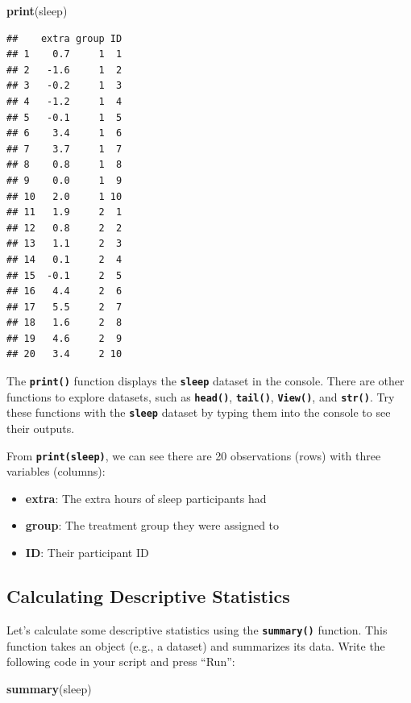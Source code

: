 \documentclass[
]{book}
\newenvironment{Shaded}{\begin{snugshade}}{\end{snugshade}}
\newcommand{\FunctionTok}[1]{\textcolor[rgb]{0.13,0.29,0.53}{\textbf{#1}}}
\newcommand{\NormalTok}[1]{#1}
\begin{document}
\begin{Shaded}
\begin{Highlighting}[]
\FunctionTok{print}\NormalTok{(sleep) }
\end{Highlighting}
\end{Shaded}

\begin{verbatim}
##    extra group ID
## 1    0.7     1  1
## 2   -1.6     1  2
## 3   -0.2     1  3
## 4   -1.2     1  4
## 5   -0.1     1  5
## 6    3.4     1  6
## 7    3.7     1  7
## 8    0.8     1  8
## 9    0.0     1  9
## 10   2.0     1 10
## 11   1.9     2  1
## 12   0.8     2  2
## 13   1.1     2  3
## 14   0.1     2  4
## 15  -0.1     2  5
## 16   4.4     2  6
## 17   5.5     2  7
## 18   1.6     2  8
## 19   4.6     2  9
## 20   3.4     2 10
\end{verbatim}

The \textbf{\texttt{print()}} function displays the \textbf{\texttt{sleep}} dataset in the console. There are other functions to explore datasets, such as \textbf{\texttt{head()}}, \textbf{\texttt{tail()}}, \textbf{\texttt{View()}}, and \textbf{\texttt{str()}}. Try these functions with the \textbf{\texttt{sleep}} dataset by typing them into the console to see their outputs.

From \textbf{\texttt{print(sleep)}}, we can see there are 20 observations (rows) with three variables (columns):

\begin{itemize}
\item
  \textbf{extra}: The extra hours of sleep participants had
\item
  \textbf{group}: The treatment group they were assigned to
\item
  \textbf{ID}: Their participant ID
\end{itemize}

\subsection{Calculating Descriptive Statistics}\label{calculating-descriptive-statistics}

Let's calculate some descriptive statistics using the \textbf{\texttt{summary()}} function. This function takes an object (e.g., a dataset) and summarizes its data. Write the following code in your script and press ``Run'':

\begin{Shaded}
\begin{Highlighting}[]
\FunctionTok{summary}\NormalTok{(sleep) }
\end{Highlighting}
\end{Shaded}
\end{document}
